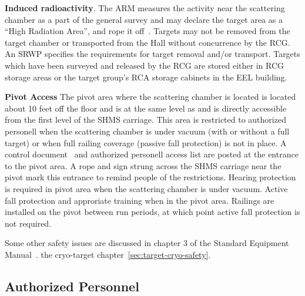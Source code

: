 {\begin{safetyen}{0}{0}
\begin{list}{.~}{\setlength{\itemsep}{-0.15cm}}
  \item {\bf Induced radioactivity}. The ARM measures the activity
    near the scattering chamber as a part of the general survey and
    may declare the target area as a ``High Radiation Area'', and rope
    it off~\cite{RWIcebaf}.  Targets may not be removed from the
    target chamber or transported from the Hall without concurrence by
    the RCG. An SRWP specifies the requirements for target removal
    and/or transport. Targets which have been surveyed and released by
    the RCG are stored either in RCG storage areas or the target
    group's RCA storage cabinets in the EEL building.

\item {\bf Pivot Access} The pivot area where the scattering
  chamber is located is located about 10 feet off the floor and is
  at the same level as and is directly accessible from the first level
  of the SHMS carriage.  This area is restricted
  to authorized personell
  when the scattering chamber
  is under vacuum (with or without a full target) or when full railing
  coverage (passive fall protection) is not in place.  A control
  document~\cite{PivotOSP} and authorized personell access list
  are posted at the entrance to the pivot area.  A rope and sign strung
  across the SHMS carriage near the pivot
  mark this entrance to remind people of the restrictions.
  Hearing protection is required in pivot area when the scattering chamber
  is under vacuum.
  Active fall protection and approriate training when in the pivot area.
  Railings are installed on the pivot between run periods, at which
  point active fall protection is not required.

\end{list}

Some other safety issues are discussed in
\ifdefined\PIVOTOSP
chapter 3 of the Standard Equipment Manual~\cite{HallCosp}.
\else
the cryo-target chapter~\ref{sec:target-cryo-safety}.
\fi


\subsection[Authorized  Personnel]{Authorized  Personnel}


\end{safetyen}}

